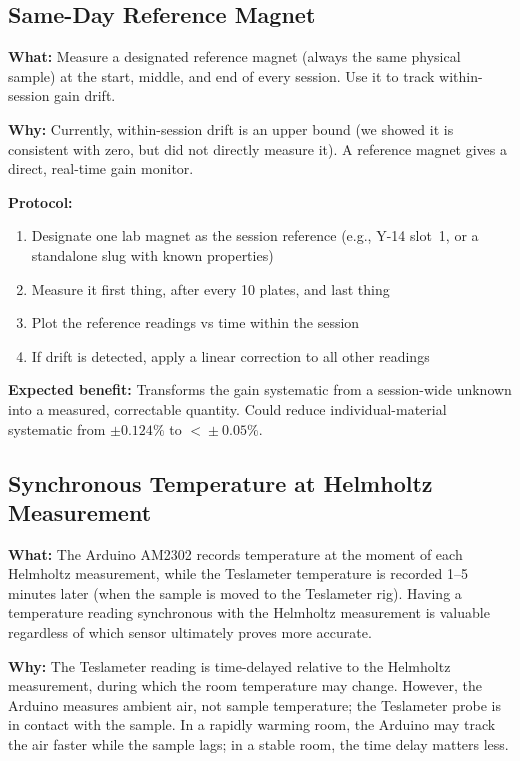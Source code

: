 \documentclass[11pt,letterpaper]{article}
\begin{document}
\subsection{Same-Day Reference Magnet}
\label{sec:helm-refmag}

\textbf{What:} Measure a designated reference magnet (always the same physical
sample) at the start, middle, and end of every session. Use it to track
within-session gain drift.

\textbf{Why:} Currently, within-session drift is an upper bound (we showed it is
consistent with zero, but did not directly measure it). A reference magnet gives
a direct, real-time gain monitor.

\textbf{Protocol:}
\begin{enumerate}[nosep]
  \item Designate one lab magnet as the session reference (e.g., Y-14 slot~1, or
    a standalone slug with known properties)
  \item Measure it first thing, after every 10 plates, and last thing
  \item Plot the reference readings vs time within the session
  \item If drift is detected, apply a linear correction to all other readings
\end{enumerate}

\textbf{Expected benefit:} Transforms the gain systematic from a session-wide
unknown into a measured, correctable quantity. Could reduce
individual-material systematic from $\pm 0.124\%$ to $<\!\pm 0.05\%$.


\subsection{Synchronous Temperature at Helmholtz Measurement}
\label{sec:helm-synctemp}

\textbf{What:} The Arduino AM2302 records temperature at the moment of each
Helmholtz measurement, while the Teslameter temperature is recorded 1--5 minutes
later (when the sample is moved to the Teslameter rig). Having a temperature
reading synchronous with the Helmholtz measurement is valuable regardless of
which sensor ultimately proves more accurate.

\textbf{Why:} The Teslameter reading is time-delayed relative to the Helmholtz
measurement, during which the room temperature may change. However, the Arduino
measures ambient air, not sample temperature; the Teslameter probe is in contact
with the sample. In a rapidly warming room, the Arduino may track the air faster
while the sample lags; in a stable room, the time delay matters less.
\end{document}
